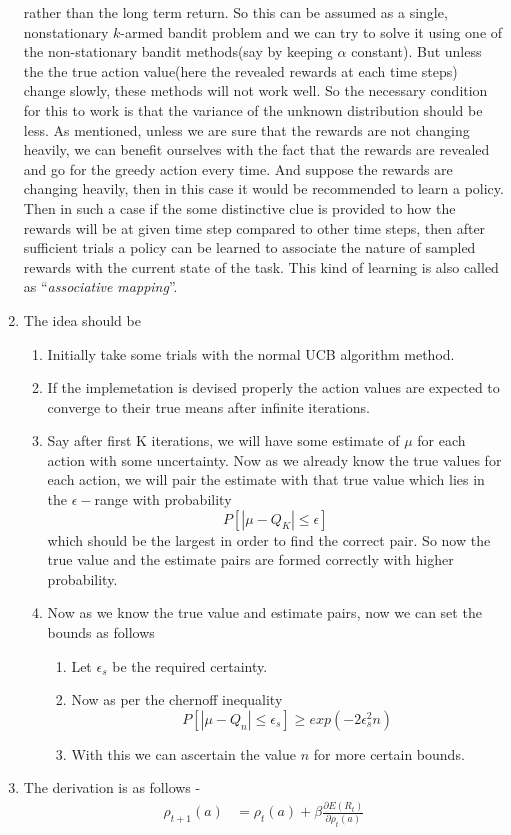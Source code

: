 \documentclass[a4paper,english]{article}
\begin{document}
\begin{enumerate}
rather than the long term return. So this can be assumed as a single,
nonstationary $k$-armed bandit problem and we can try to solve it
using one of the non-stationary bandit methods(say by keeping $\alpha$
constant). But unless the the true action value(here the revealed
rewards at each time steps) change slowly, these methods will not
work well. So the necessary condition for this to work is that the
variance of the unknown distribution should be less. As mentioned,
unless we are sure that the rewards are not changing heavily, we can
benefit ourselves with the fact that the rewards are revealed and
go for the greedy action every time. And suppose the rewards are changing
heavily, then in this case it would be recommended to learn a policy.
Then in such a case if the some distinctive clue is provided to how
the rewards will be at given time step compared to other time steps,
then after sufficient trials a policy can be learned to associate
the nature of sampled rewards with the current state of the task.
This kind of learning is also called as ``\textit{associative mapping}''.
\item The idea should be
\begin{enumerate}
\item Initially take some trials with the normal UCB algorithm method.
\item If the implemetation is devised properly the action values are expected
to converge to their true means after infinite iterations.
\item Say after first K iterations, we will have some estimate of $\mu$
for each action with some uncertainty. Now as we already know the
true values for each action, we will pair the estimate with that true
value which lies in the $\epsilon-$range with probability
\[
P[|\mu-Q_{K}|\leq\epsilon]
\]
 which should be the largest in order to find the correct pair. So
now the true value and the estimate pairs are formed correctly with
higher probability.
\item Now as we know the true value and estimate pairs, now we can set the
bounds as follows
\begin{enumerate}
\item Let $\epsilon_{s}$ be the required certainty.
\item Now as per the chernoff inequality
\[
P[|\mu-Q_{n}|\leq\epsilon_{s}]\geq exp(-2\epsilon_{s}^{2}n)
\]
\item With this we can ascertain the value $n$ for more certain bounds.
\end{enumerate}
\end{enumerate}
\item The derivation is as follows -
\begin{align*}
\rho_{t+1}(a) & =\rho_{t}(a)+\beta\frac{\partial E(R_{t})}{\partial\rho_{t}(a)}\\
\end{align*}


\end{enumerate}
\end{document}
